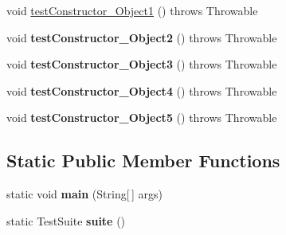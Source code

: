 \begin{DoxyCompactItemize}
\item 
void \hyperlink{classorg_1_1joda_1_1time_1_1_test_duration___constructors_a23640529104ef7d86b671bb25247acc3}{test\-Constructor\-\_\-\-Object1} ()  throws Throwable 
\item 
\hypertarget{classorg_1_1joda_1_1time_1_1_test_duration___constructors_a3b34305297d48e32345455caebee4cd1}{void {\bfseries test\-Constructor\-\_\-\-Object2} ()  throws Throwable }\label{classorg_1_1joda_1_1time_1_1_test_duration___constructors_a3b34305297d48e32345455caebee4cd1}

\item 
\hypertarget{classorg_1_1joda_1_1time_1_1_test_duration___constructors_accd36ec0be0b28e9f10c034c4222cfe1}{void {\bfseries test\-Constructor\-\_\-\-Object3} ()  throws Throwable }\label{classorg_1_1joda_1_1time_1_1_test_duration___constructors_accd36ec0be0b28e9f10c034c4222cfe1}

\item 
\hypertarget{classorg_1_1joda_1_1time_1_1_test_duration___constructors_a003d886deb6a635da97ec86e6604d037}{void {\bfseries test\-Constructor\-\_\-\-Object4} ()  throws Throwable }\label{classorg_1_1joda_1_1time_1_1_test_duration___constructors_a003d886deb6a635da97ec86e6604d037}

\item 
\hypertarget{classorg_1_1joda_1_1time_1_1_test_duration___constructors_a7f6df8b45dbdfcd273fb226130d80d28}{void {\bfseries test\-Constructor\-\_\-\-Object5} ()  throws Throwable }\label{classorg_1_1joda_1_1time_1_1_test_duration___constructors_a7f6df8b45dbdfcd273fb226130d80d28}

\end{DoxyCompactItemize}
\subsection*{Static Public Member Functions}
\begin{DoxyCompactItemize}
\item 
\hypertarget{classorg_1_1joda_1_1time_1_1_test_duration___constructors_a6f96c4d6934dac1143b6a127b2937cbf}{static void {\bfseries main} (String\mbox{[}$\,$\mbox{]} args)}\label{classorg_1_1joda_1_1time_1_1_test_duration___constructors_a6f96c4d6934dac1143b6a127b2937cbf}

\item 
\hypertarget{classorg_1_1joda_1_1time_1_1_test_duration___constructors_a2a4feac099910c23b5e3132b35e71d7e}{static Test\-Suite {\bfseries suite} ()}\label{classorg_1_1joda_1_1time_1_1_test_duration___constructors_a2a4feac099910c23b5e3132b35e71d7e}

\end{DoxyCompactItemize}
